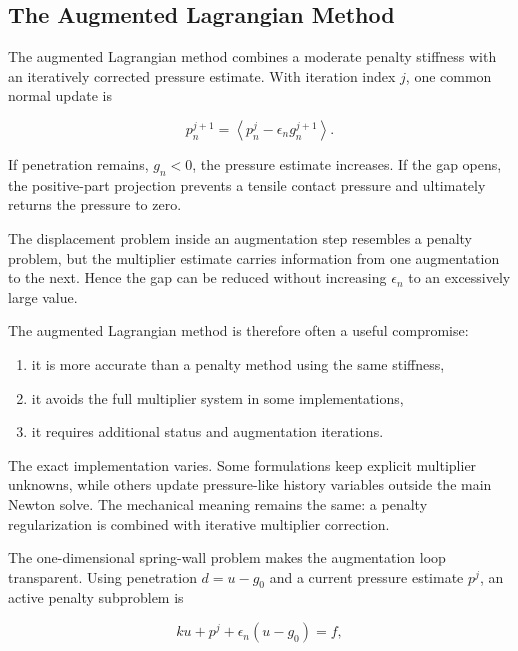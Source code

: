 \subsection{The Augmented Lagrangian Method}

The augmented Lagrangian method combines a moderate penalty stiffness with an
iteratively corrected pressure estimate. With iteration index $ j $, one common
normal update is

\begin{bbox}
    \begin{equation}\label{contact-augmented-lagrange-update}
        p_n^{j+1} =
        \left\langle p_n^j - \epsilon_n g_n^{j+1} \right\rangle.
    \end{equation}
\end{bbox}

If penetration remains, $ g_n<0 $, the pressure estimate increases. If the gap
opens, the positive-part projection prevents a tensile contact pressure and
ultimately returns the pressure to zero.

The displacement problem inside an augmentation step resembles a penalty
problem, but the multiplier estimate carries information from one augmentation
to the next. Hence the gap can be reduced without increasing $ \epsilon_n $ to
an excessively large value.

The augmented Lagrangian method is therefore often a useful compromise:

\begin{enumerate}
    \item it is more accurate than a penalty method using the same stiffness,
    \item it avoids the full multiplier system in some implementations,
    \item it requires additional status and augmentation iterations.
\end{enumerate}

The exact implementation varies. Some formulations keep explicit multiplier
unknowns, while others update pressure-like history variables outside the main
Newton solve. The mechanical meaning remains the same: a penalty regularization
is combined with iterative multiplier correction.


The one-dimensional spring-wall problem makes the augmentation loop transparent.
Using penetration $d=u-g_0$ and a current pressure estimate $p^j$, an active
penalty subproblem is

\begin{equation}
    k u + p^j + \epsilon_n(u-g_0)=f,
\end{equation}

